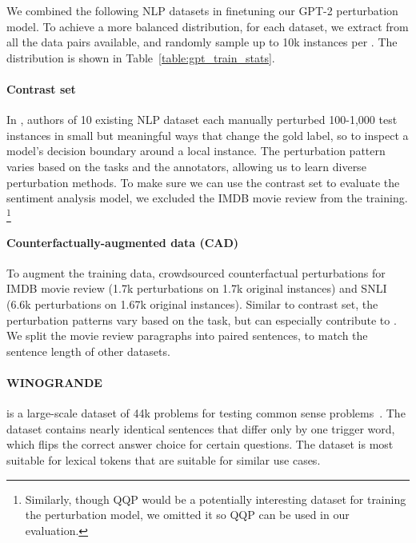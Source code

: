 We combined the following NLP datasets in finetuning our GPT-2 perturbation model.
To achieve a more balanced distribution, for each dataset, we extract \tagstrs from all the data pairs available, and randomly sample up to 10k instances per \tagstr.
The distribution is shown in Table~\ref{table:gpt_train_stats}.

\paragraph{Contrast set}
In \cite{gardner2020contrast}, authors of 10 existing NLP dataset each manually perturbed 100-1,000 test instances in small but meaningful ways that change the gold label, so to inspect a model's decision boundary around a local instance.
The perturbation pattern varies based on the tasks and the annotators, allowing us to learn diverse perturbation methods.
To make sure we can use the contrast set to evaluate the sentiment analysis model, we excluded the IMDB movie review from the training.
\footnote{Similarly, though QQP would be a potentially interesting dataset for training the perturbation model, we omitted it so QQP can be used in our evaluation.}


\paragraph{Counterfactually-augmented data (CAD)}
To augment the training data, \citet{kaushik2019learning} crowdsourced counterfactual perturbations for IMDB movie review (1.7k perturbations on 1.7k original instances) and SNLI (6.6k perturbations on 1.67k original instances).
Similar to contrast set, the perturbation patterns vary based on the task, but can especially contribute to .
We split the movie review paragraphs into paired sentences, to match the sentence length of other datasets.


\paragraph{WINOGRANDE} is a large-scale dataset of 44k problems for testing common sense problems~\cite{sakaguchi2019winogrande}.
The dataset contains nearly identical sentences that differ only by one trigger word, which flips the correct answer choice for certain questions.
The dataset is most suitable for lexical tokens that are suitable for similar use cases.

